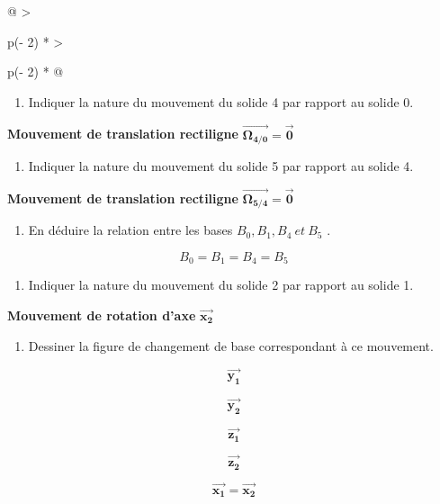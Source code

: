 \begin{longtable}{@{}
  >{\raggedright\arraybackslash}p{(\columnwidth - 2\tabcolsep) * }
  >{\raggedright\arraybackslash}p{(\columnwidth - 2\tabcolsep) * }@{}}
\begin{minipage}[b]{\linewidth}
\begin{enumerate}
\def\labelenumi{\arabic{enumi}.}
\setcounter{enumi}{1}
\item
  Indiquer la nature du mouvement du solide 4 par rapport au solide 0.
\end{enumerate}

\textbf{Mouvement de translation rectiligne}
\(\overrightarrow{\mathbf{\Omega}_{\mathbf{4}\mathbf{/0}}}\mathbf{=}\overrightarrow{\mathbf{0}}\)

\begin{enumerate}
\def\labelenumi{\arabic{enumi}.}
\setcounter{enumi}{2}
\item
  Indiquer la nature du mouvement du solide 5 par rapport au solide 4.
\end{enumerate}

\textbf{Mouvement de translation rectiligne}
\(\overrightarrow{\mathbf{\Omega}_{\mathbf{5}\mathbf{/}\mathbf{4}}}\mathbf{=}\overrightarrow{\mathbf{0}}\)

\begin{enumerate}
\def\labelenumi{\arabic{enumi}.}
\setcounter{enumi}{3}
\item
  En déduire la relation entre les bases
  \(B_{0},B_{1}, B_{4}\ et\ B_{5}\) .
\end{enumerate}

\[B_{0} = B_{1} = B_{4} = B_{5}\]

\begin{enumerate}
\def\labelenumi{\arabic{enumi}.}
\setcounter{enumi}{4}
\item
  Indiquer la nature du mouvement du solide 2 par rapport au solide 1.
\end{enumerate}

\textbf{Mouvement de rotation d'axe}
\(\overrightarrow{\mathbf{x}_{\mathbf{2}}}\)

\begin{enumerate}
\def\labelenumi{\arabic{enumi}.}
\setcounter{enumi}{5}
\item
  Dessiner la figure de changement de base correspondant à ce mouvement.
\end{enumerate}

\[\overrightarrow{\mathbf{y}_{\mathbf{1}}}\]

\[\overrightarrow{\mathbf{y}_{\mathbf{2}}}\]

\[\overrightarrow{\mathbf{z}_{\mathbf{1}}}\]

\[\overrightarrow{\mathbf{z}_{\mathbf{2}}}\]

\[\overrightarrow{\mathbf{x}_{\mathbf{1}}}\mathbf{=}\overrightarrow{\mathbf{x}_{\mathbf{2}}}\]


\end{minipage}
\end{longtable}
